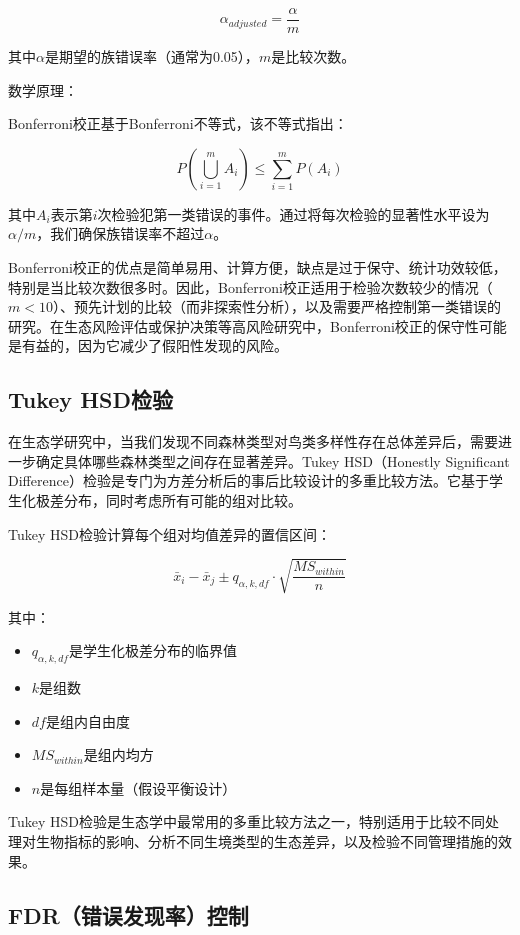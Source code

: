 \documentclass[
  twoside,12pt,fontset=none]{ctexbook}
\providecommand{\tightlist}{%
  \setlength{\itemsep}{0pt}\setlength{\parskip}{0pt}}
\begin{document}
\[\alpha_{adjusted} = \frac{\alpha}{m}\]

其中\(\alpha\)是期望的族错误率（通常为0.05），\(m\)是比较次数。

数学原理：

Bonferroni校正基于Bonferroni不等式，该不等式指出：

\[P(\bigcup_{i=1}^m A_i) \leq \sum_{i=1}^m P(A_i)\]

其中\(A_i\)表示第\(i\)次检验犯第一类错误的事件。通过将每次检验的显著性水平设为\(\alpha/m\)，我们确保族错误率不超过\(\alpha\)。

Bonferroni校正的优点是简单易用、计算方便，缺点是过于保守、统计功效较低，特别是当比较次数很多时。因此，Bonferroni校正适用于检验次数较少的情况（\(m < 10\)）、预先计划的比较（而非探索性分析），以及需要严格控制第一类错误的研究。在生态风险评估或保护决策等高风险研究中，Bonferroni校正的保守性可能是有益的，因为它减少了假阳性发现的风险。

\hypertarget{tukey-hsdux68c0ux9a8c}{%
\subsection{Tukey HSD检验}\label{tukey-hsdux68c0ux9a8c}}

在生态学研究中，当我们发现不同森林类型对鸟类多样性存在总体差异后，需要进一步确定具体哪些森林类型之间存在显著差异。Tukey HSD（Honestly Significant Difference）检验是专门为方差分析后的事后比较设计的多重比较方法。它基于学生化极差分布，同时考虑所有可能的组对比较。

Tukey HSD检验计算每个组对均值差异的置信区间：

\[\bar{x}_i - \bar{x}_j \pm q_{\alpha,k,df} \cdot \sqrt{\frac{MS_{within}}{n}}\]

其中：

\begin{itemize}
\tightlist
\item
  \(q_{\alpha,k,df}\)是学生化极差分布的临界值
\item
  \(k\)是组数
\item
  \(df\)是组内自由度
\item
  \(MS_{within}\)是组内均方
\item
  \(n\)是每组样本量（假设平衡设计）
\end{itemize}

Tukey HSD检验是生态学中最常用的多重比较方法之一，特别适用于比较不同处理对生物指标的影响、分析不同生境类型的生态差异，以及检验不同管理措施的效果。

\hypertarget{fdrux9519ux8befux53d1ux73b0ux7387ux63a7ux5236}{%
\subsection{FDR（错误发现率）控制}\label{fdrux9519ux8befux53d1ux73b0ux7387ux63a7ux5236}}
\end{document}
